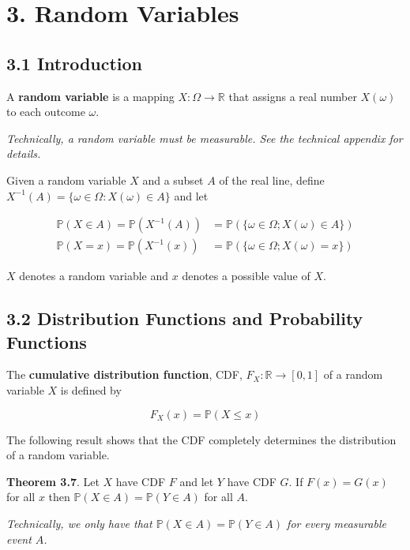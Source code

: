 \section{3. Random Variables}\label{random-variables}

\subsection{3.1 Introduction}\label{introduction}

A \textbf{random variable} is a mapping
\(X : \Omega \rightarrow \mathbb{R}\) that assigns a real number
\(X(\omega)\) to each outcome \(\omega\).

\emph{Technically, a random variable must be measurable. See the
technical appendix for details.}

Given a random variable \(X\) and a subset \(A\) of the real line,
define \(X^{-1}(A) = \{ \omega \in \Omega : X(\omega) \in A \}\) and let

\begin{align}
\mathbb{P}(X \in A) = \mathbb{P}(X^{-1}(A)) &= \mathbb{P}(\{ \omega \in \Omega; X(\omega) \in A \}) \\
\mathbb{P}(X = x) = \mathbb{P}(X^{-1}(x)) &= \mathbb{P}(\{ \omega \in \Omega; X(\omega) = x \} )
\end{align}

\(X\) denotes a random variable and \(x\) denotes a possible value of
\(X\).

\subsection{3.2 Distribution Functions and Probability
Functions}\label{distribution-functions-and-probability-functions}

The \textbf{cumulative distribution function}, CDF,
\(F_X : \mathbb{R} \rightarrow [0, 1]\) of a random variable \(X\) is
defined by

\[ F_X(x) = \mathbb{P}(X \leq x) \]

The following result shows that the CDF completely determines the
distribution of a random variable.

\textbf{Theorem 3.7}. Let \(X\) have CDF \(F\) and let \(Y\) have CDF
\(G\). If \(F(x) = G(x)\) for all \(x\) then
\(\mathbb{P}(X \in A) = \mathbb{P}(Y \in A)\) for all \(A\).

\emph{Technically, we only have that
\(\mathbb{P}(X \in A) = \mathbb{P}(Y \in A)\) for every measurable event
\(A\).}

